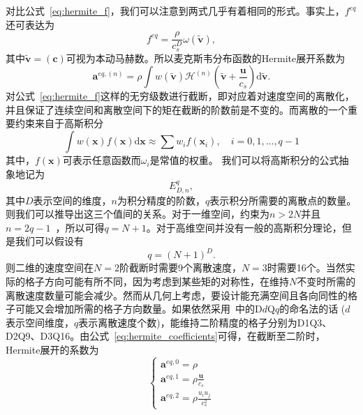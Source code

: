 对比公式~\ref{eq:hermite_f}，我们可以注意到两式几乎有着相同的形式。事实上，$f^{eq}$还可表达为
\begin{equation}
    f^{eq}=\frac{\rho}{c_s^D}\omega(\tilde{\boldsymbol{v}}),
\end{equation}
其中$\tilde{\boldsymbol{v}}=(\mathbf{c})$可视为本动马赫数。所以麦克斯韦分布函数的Hermite展开系数为
\begin{equation}
    \boldsymbol{a}^{eq,(n)}=\rho \int w(\tilde{\boldsymbol{v}}) \mathscr{H}^{(n)}\left(\tilde{\boldsymbol{v}}+\frac{\boldsymbol{u}}{c_s}\right) \mathrm{d} \tilde{\boldsymbol{v}}.
    \label{eq:hermite_coefficients}
\end{equation}
对公式~\ref{eq:hermite_f}这样的无穷级数进行截断，即对应着对速度空间的离散化，并且保证了连续空间和离散空间下的矩在截断的阶数前是不变的。而离散的一个重要约束来自于高斯积分
\begin{equation}
    \int w(\boldsymbol{x}) f(\boldsymbol{x}) \mathrm{d} \boldsymbol{x} \approx \sum w_i f(\boldsymbol{x}_i), \quad i=0,1, \ldots, q-1
\end{equation}
其中，$f(\boldsymbol{x})$可表示任意函数而$\omega_i$是常值的权重。
我们可以将高斯积分的公式抽象地记为
\begin{equation}
    E^q_{D,n},
\end{equation}
其中$D$表示空间的维度，$n$为积分精度的阶数，$q$表示积分所需要的离散点的数量。则我们可以推导出这三个值间的关系。对于一维空间，约束为$n>2N$并且$n=2q-1$~\citep{shan2006kinetic}，所以可得$q=N+1$。对于高维空间并没有一般的高斯积分理论，但是我们可以假设有
\begin{equation}
    q=(N+1)^D.
\end{equation}
则二维的速度空间在$N=2$阶截断时需要9个离散速度，$N=3$时需要16个。当然实际的格子方向可能有所不同，因为考虑到某些矩的对称性，在维持$N$不变时所需的离散速度数量可能会减少。然而从几何上考虑，要设计能充满空间且各向同性的格子可能又会增加所需的格子方向数量。如果依然采用~\citep{qian1992lattice}中的D$d$Q$q$的命名法的话 ($d$表示空间维度，$q$表示离散速度个数)，能维持二阶精度的格子分别为D1Q3、D2Q9、D3Q16。由公式~\ref{eq:hermite_coefficients}可得，在截断至二阶时，Hermite展开的系数为
\begin{equation}
    \left\{\begin{array}{l}\boldsymbol{a}^{eq, 0}=\rho \\ \boldsymbol{a}^{eq, 1}=\rho \frac{\boldsymbol{u}}{c_s} \\ \boldsymbol{a}^{eq, 2}=\rho \frac{u_i u_j}{c_s^2}\end{array}\right.
\end{equation}
